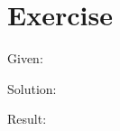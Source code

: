 \documentclass[a4paper, 10pt]{scrartcl}
\begin{document}
\section{Exercise }

Given:
\[
\]

Solution:

Result:
\end{document}
